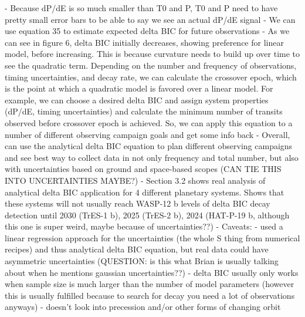 \documentclass[oneside,12pt]{amsart}
\numberwithin{page}{section}
\begin{document}
- Because dP/dE is so much smaller than T0 and P, T0 and P need to have pretty small error bars to be able to say we see an actual dP/dE signal
- We can use equation 35 to estimate expected delta BIC for future observations
- As we can see in figure 6, delta BIC initially decreases, showing preference for linear model, before increasing. This is because curvature needs to build up over time to see the quadratic term. Depending on the number and frequency of observations, timing uncertainties, and decay rate, we can calculate the crossover epoch, which is the point at which a quadratic model is favored over a linear model. For example, we can choose a desired delta BIC and assign system properties (dP/dE, timing uncertainties) and calculate the minimum number of transits observed before crossover epoch is achieved. So, we can apply this equation to a number of different observing campaign goals and get some info back
- Overall, can use the analytical delta BIC equation to plan different observing campaigns and see best way to collect data in not only frequency and total number, but also with uncertainties based on ground and space-based scopes (CAN TIE THIS INTO UNCERTAINTIES MAYBE?)
- Section 3.2 shows real analysis of analytical delta BIC application for 4 different planetary systems. Shows that these systems will not usually reach WASP-12 b levels of delta BIC decay detection until 2030 (TrES-1 b), 2025 (TrES-2 b), 2024 (HAT-P-19 b, although this one is super weird, maybe because of uncertainties??)
- Caveats: 
    - used a linear regression approach for the uncertainties (the whole S thing from numerical recipes) and thus analytical delta BIC equation, but real data could have asymmetric uncertainties (QUESTION: is this what Brian is usually talking about when he mentions gaussian uncertainties??)
    - delta BIC usually only works when sample size is much larger than the number of model parameters (however this is usually fulfilled because to search for decay you need a lot of observations anyways)
    - doesn't look into precession and/or other forms of changing orbit

\cite{carter2008analytic}
\end{document}
